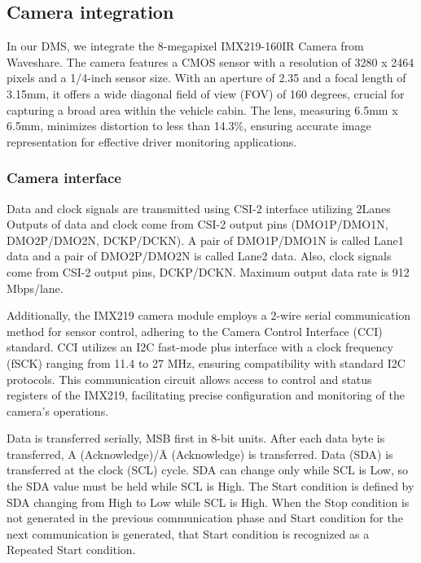 \subsection{Camera integration}
In our DMS, we integrate the 8-megapixel IMX219-160IR Camera from Waveshare. 
The camera features a CMOS sensor with a resolution of 3280 x 2464 pixels and a 1/4-inch sensor size. With an aperture of 2.35 and a focal length of 3.15mm, it offers a wide diagonal field of view (FOV) of 160 degrees, crucial for capturing a broad area within the vehicle cabin. The lens, measuring 6.5mm x 6.5mm, minimizes distortion to less than 14.3\%, ensuring accurate image representation for effective driver monitoring applications.

\subsubsection{\textbf{Camera interface}}
Data and clock signals are transmitted using CSI-2 interface utilizing 2Lanes Outputs of data and clock come from CSI-2 output pins (DMO1P/DMO1N, DMO2P/DMO2N, DCKP/DCKN). A pair of DMO1P/DMO1N is called Lane1 data and a pair of DMO2P/DMO2N is called Lane2 data. Also, clock signals come from CSI-2 output pins, DCKP/DCKN. Maximum output data rate is 912 Mbps/lane.

Additionally, the IMX219 camera module employs a 2-wire serial communication method for sensor control, adhering to the Camera Control Interface (CCI) standard. CCI utilizes an I2C fast-mode plus interface with a clock frequency (fSCK) ranging from 11.4 to 27 MHz, ensuring compatibility with standard I2C protocols. This communication circuit allows access to control and status registers of the IMX219, facilitating precise configuration and monitoring of the camera's operations.

Data is transferred serially, MSB first in 8-bit units. After each data byte is transferred, A (Acknowledge)/Ā (Acknowledge) is transferred. Data (SDA) is transferred at the clock (SCL) cycle. SDA can change only while SCL is Low, so the SDA value must be held while SCL is High. The Start condition is defined by SDA changing from High to Low while SCL is High. When the Stop
condition is not generated in the previous communication phase and Start condition for the next communication is generated, that Start condition is recognized as a Repeated Start condition.